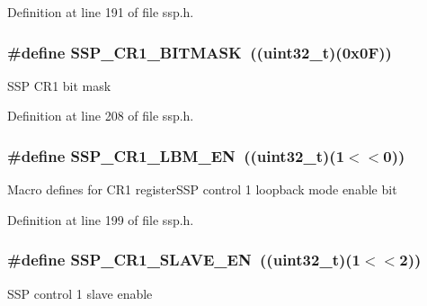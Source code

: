 Definition at line 191 of file ssp.\+h.

\subsubsection[{\texorpdfstring{S\+S\+P\+\_\+\+C\+R1\+\_\+\+B\+I\+T\+M\+A\+SK}{SSP_CR1_BITMASK}}]{\setlength{\rightskip}{0pt plus 5cm}\#define S\+S\+P\+\_\+\+C\+R1\+\_\+\+B\+I\+T\+M\+A\+SK~(({\bf uint32\+\_\+t})(0x0\+F))}\hypertarget{group___s_s_p___private___macros_gad90a9c1c97a5c4e19e048e9686a4d8fa}{}\label{group___s_s_p___private___macros_gad90a9c1c97a5c4e19e048e9686a4d8fa}
S\+SP C\+R1 bit mask 

Definition at line 208 of file ssp.\+h.

\subsubsection[{\texorpdfstring{S\+S\+P\+\_\+\+C\+R1\+\_\+\+L\+B\+M\+\_\+\+EN}{SSP_CR1_LBM_EN}}]{\setlength{\rightskip}{0pt plus 5cm}\#define S\+S\+P\+\_\+\+C\+R1\+\_\+\+L\+B\+M\+\_\+\+EN~(({\bf uint32\+\_\+t})(1$<$$<$0))}\hypertarget{group___s_s_p___private___macros_gac0e5bef37b94df5ad96bf270aa802dcd}{}\label{group___s_s_p___private___macros_gac0e5bef37b94df5ad96bf270aa802dcd}
Macro defines for C\+R1 register\+S\+SP control 1 loopback mode enable bit 

Definition at line 199 of file ssp.\+h.

\subsubsection[{\texorpdfstring{S\+S\+P\+\_\+\+C\+R1\+\_\+\+S\+L\+A\+V\+E\+\_\+\+EN}{SSP_CR1_SLAVE_EN}}]{\setlength{\rightskip}{0pt plus 5cm}\#define S\+S\+P\+\_\+\+C\+R1\+\_\+\+S\+L\+A\+V\+E\+\_\+\+EN~(({\bf uint32\+\_\+t})(1$<$$<$2))}\hypertarget{group___s_s_p___private___macros_ga483d570ffc25bc917c99b3e8ece75649}{}\label{group___s_s_p___private___macros_ga483d570ffc25bc917c99b3e8ece75649}
S\+SP control 1 slave enable 


